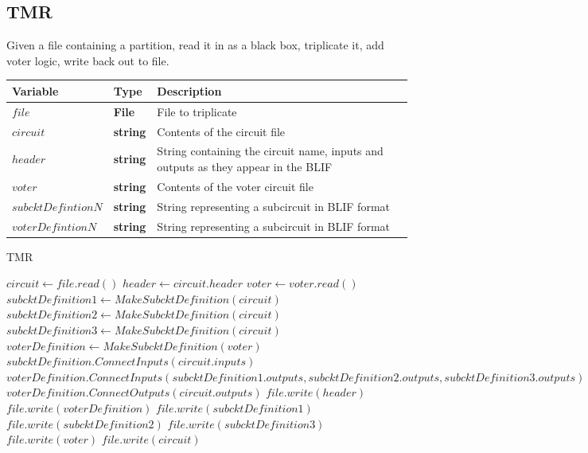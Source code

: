\documentclass[12pt,final,oneside]{article} %
\begin{document}
\newpage
\subsection{TMR}
Given a file containing a partition, read it in as a black box, triplicate it, add voter logic, write back out to file.


\begin{algorithm}
    \begin{center}
        \begin{tabularx}{\linewidth}{llX}
        \toprule
        Variable & Type & Description\\
        \midrule
        $file$ &\bf  File & File to triplicate\\
        $circuit$ &\bf  string & Contents of the circuit file\\
        $header$ &\bf  string & String containing the circuit name, inputs and outputs as they appear in the \ac{BLIF}\\
        $voter$ &\bf  string & Contents of the voter circuit file\\
        $subcktDefintionN$ &\bf  string & String representing a subcircuit in \ac{BLIF} format\\
        $voterDefintionN$ &\bf  string & String representing a subcircuit in \ac{BLIF} format\\
        \bottomrule
        \end{tabularx}
    \end{center}
   \caption{TMR}\label{TMR}
   \begin{algorithmic}[1]
         \State $circuit \gets file.read()$
         \State $header \gets circuit.header$
         \State $voter \gets voter.read()$
         \State $subcktDefinition1 \gets MakeSubcktDefinition(circuit)$
         \State $subcktDefinition2 \gets MakeSubcktDefinition(circuit)$
         \State $subcktDefinition3 \gets MakeSubcktDefinition(circuit)$
         \State $voterDefinition \gets MakeSubcktDefinition(voter)$
         \State $subcktDefinition.ConnectInputs(circuit.inputs)$
         \State $voterDefinition.ConnectInputs(subcktDefinition1.outputs, subcktDefinition2.outputs, subcktDefinition3.outputs)$ 
         \State $voterDefinition.ConnectOutputs(circuit.outputs)$
         \State $file.write(header)$
         \State $file.write(voterDefinition)$
         \State $file.write(subcktDefinition1)$
         \State $file.write(subcktDefinition2)$
         \State $file.write(subcktDefinition3)$
         \State $file.write(voter)$
         \State $file.write(circuit)$
      \EndProcedure
   \end{algorithmic}
\end{algorithm}
\end{document}
